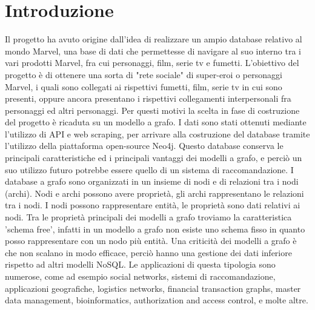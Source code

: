 \documentclass[
12pt, %
a4paper, %
oneside, %
headinclude,footinclude, %
BCOR5mm, %
]{scrartcl}
\begin{document}



\newpage %


\section{Introduzione}
Il progetto ha avuto origine dall'idea di realizzare un ampio database relativo al mondo Marvel, una base di dati che permettesse di navigare al suo interno tra i vari prodotti Marvel, fra cui personaggi, film, serie tv e fumetti.
L'obiettivo del progetto è di ottenere una sorta di "rete sociale" di super-eroi o personaggi Marvel, i quali sono collegati ai rispettivi fumetti, film, serie tv in cui sono presenti, oppure ancora presentano i rispettivi collegamenti interpersonali fra personaggi ed altri personaggi.
Per questi motivi la scelta in fase di costruzione del progetto è ricaduta su un modello a grafo.
I dati sono stati ottenuti mediante l'utilizzo di API e web scraping, per arrivare alla costruzione del database tramite l'utilizzo della piattaforma open-source Neo4j.
Questo database conserva le principali caratteristiche ed i principali vantaggi dei modelli a grafo, e perciò un suo utilizzo futuro potrebbe essere quello di un sistema di raccomandazione.
I database a grafo sono organizzati in un insieme di nodi e di relazioni tra i nodi (archi).
Nodi e archi possono avere proprietà, gli archi rappresentano le relazioni tra i nodi. I nodi possono rappresentare entità, le proprietà sono dati relativi ai nodi.
Tra le proprietà principali dei modelli a grafo troviamo la caratteristica 'schema free', infatti in un modello a grafo non esiste uno schema fisso in quanto posso rappresentare con un nodo più entità.
Una criticità dei modelli a grafo è che non scalano in modo efficace, perciò hanno una gestione dei dati inferiore rispetto ad altri modelli NoSQL.
Le applicazioni di questa tipologia sono numerose, come ad esempio social networks, sistemi di raccomandazione,
applicazioni geografiche, logistics networks, financial transaction graphs, master data management, bioinformatics,
authorization and access control, e molte altre.
 
\end{document}
